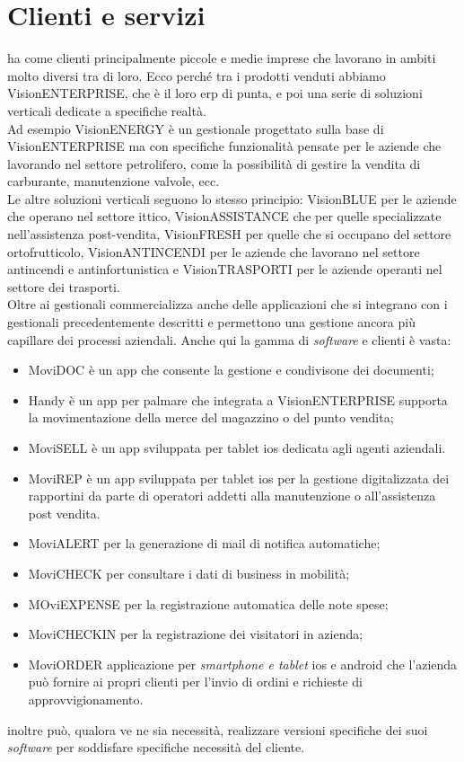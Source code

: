 \section{Clienti e servizi}
{\company} ha come clienti principalmente piccole e medie imprese che lavorano in ambiti molto diversi tra di loro.
Ecco perché tra i prodotti venduti abbiamo VisionENTERPRISE, che è il loro \gls{erp} di punta, e poi una serie di soluzioni 
verticali dedicate a specifiche realtà.\\
Ad esempio VisionENERGY è un gestionale progettato sulla base di VisionENTERPRISE ma con specifiche funzionalità pensate 
per le aziende che lavorando nel settore petrolifero, come la possibilità di gestire la vendita di carburante, manutenzione valvole, ecc.\\
Le altre soluzioni verticali seguono lo stesso principio: VisionBLUE per le aziende che operano nel settore ittico, 
VisionASSISTANCE che per quelle specializzate nell'assistenza post-vendita, VisionFRESH per quelle che si occupano del settore ortofrutticolo, 
VisionANTINCENDI per le aziende che lavorano nel settore antincendi e antinfortunistica e VisionTRASPORTI per le aziende operanti nel settore dei trasporti.\\
Oltre ai gestionali {\company} commercializza anche delle applicazioni che si integrano con i gestionali precedentemente descritti e permettono 
una gestione ancora più capillare dei processi aziendali. Anche qui la gamma di \textit{software} e clienti è vasta: 
\begin{itemize}
    \item MoviDOC è un app che consente la gestione e condivisone dei documenti;
    \item Handy è un app per palmare che integrata a VisionENTERPRISE supporta la movimentazione della merce del magazzino o del punto vendita;
    \item MoviSELL è un app sviluppata per tablet \gls{ios} dedicata agli agenti aziendali.
    \item MoviREP è un app sviluppata per tablet \gls{ios} per la gestione digitalizzata dei rapportini da parte di operatori addetti alla manutenzione o 
          all'assistenza post vendita. 
    \item MoviALERT per la generazione di mail di notifica automatiche;
    \item MoviCHECK per consultare i dati di business in mobilità;
    \item MOviEXPENSE per la registrazione automatica delle note spese;
    \item MoviCHECKIN per la registrazione dei visitatori in azienda;
    \item MoviORDER applicazione per \textit{smartphone e tablet} \gls{ios} e \gls{android} che l’azienda può fornire ai propri clienti per l’invio di ordini e 
          richieste di approvvigionamento.
\end{itemize}
{\company} inoltre può, qualora ve ne sia necessità, realizzare versioni specifiche dei suoi \textit{software} per soddisfare specifiche necessità 
del cliente.

 